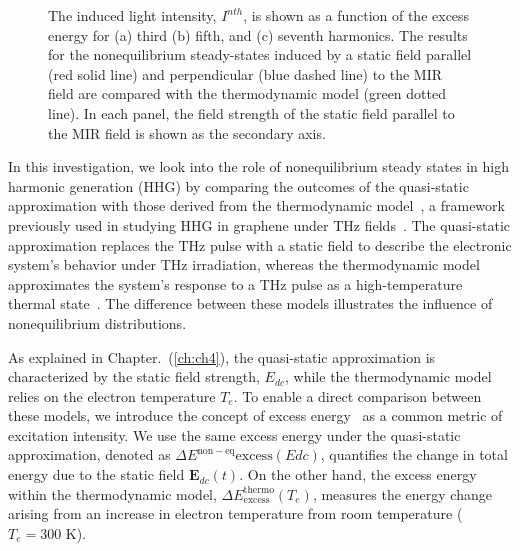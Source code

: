 \begin{figure}[htp]
	\caption{\label{fig:intensity_tem}
		The induced light intensity, $I^{\textit{n}th}$, is shown as a function of the excess energy for (a) third (b) fifth, and (c) seventh harmonics. The results for the nonequilibrium steady-states induced by a static field parallel (red solid line) and perpendicular (blue dashed line) to the MIR field are compared with the thermodynamic model (green dotted line). In each panel, the field strength of the static field parallel to the MIR field is shown as the secondary axis.
	}
\end{figure}

In this investigation, we look into the role of nonequilibrium steady states in high harmonic generation (HHG) by comparing the outcomes of the quasi-static approximation with those derived from the thermodynamic model~\cite{mics2015thermodynamic}, a framework previously used in studying HHG in graphene under THz fields~\cite{Hafez2018,doi:10.1126/sciadv.abf9809}. The quasi-static approximation replaces the THz pulse with a static field to describe the electronic system's behavior under THz irradiation, whereas the thermodynamic model approximates the system's response to a THz pulse as a high-temperature thermal state~\cite{mics2015thermodynamic}. The difference between these models illustrates the influence of nonequilibrium distributions.

As explained in Chapter.~(\ref{ch:ch4}), the quasi-static approximation is characterized by the static field strength, $E_{dc}$, while the thermodynamic model relies on the electron temperature $T_e$. To enable a direct comparison between these models, we introduce the concept of excess energy~\cite{PhysRevB.106.024313} as a common metric of excitation intensity. We use the same excess energy under the quasi-static approximation, denoted as $\Delta E^{\mathrm{non-eq}}{\textrm{excess}}(E{dc})$, quantifies the change in total energy due to the static field $\mathbf E_{dc}(t)$. On the other hand, the excess energy within the thermodynamic model, $\Delta E^{\textrm{thermo}}_{\textrm{excess}}(T_e)$, measures the energy change arising from an increase in electron temperature from room temperature ($T_e=300$ K).

